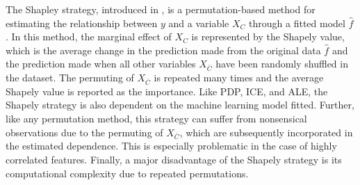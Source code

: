 \documentclass[12pt]{article}
\begin{document}
The Shapley strategy, introduced in \cite{lundberg2016unexpected}, is a permutation-based method for estimating the relationship between ${y}$ and a variable $X_C$ through a fitted model $\widehat{f}$. In this method, the marginal effect of $X_C$ is represented by the Shapely value, which is the average change in the prediction made from the original data $\widehat{f}$ and the prediction made when all other variables $X_{\overline{C}}$ have been randomly shuffled in the dataset. The permuting of $X_{\overline{C}}$ is repeated many times and the average Shapely value is reported as the importance. Like PDP, ICE, and ALE, the Shapely strategy is also dependent on the machine learning model fitted. Further, like any permutation method, this strategy can suffer from nonsensical observations due to the permuting of $X_{\overline{C}}$, which are subsequently incorporated in the estimated dependence. This is especially problematic in the case of highly correlated features. Finally, a major disadvantage of the Shapely strategy is its computational complexity due to repeated permutations. 





\end{document}
